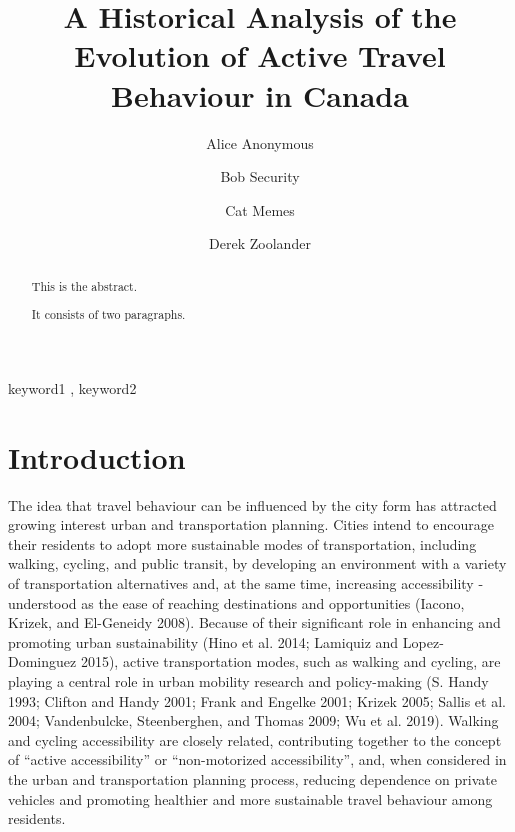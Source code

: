 \documentclass[preprint, 3p,
authoryear]{elsarticle} %
\begin{document}
\begin{frontmatter}

  \title{A Historical Analysis of the Evolution of Active Travel
Behaviour in Canada}
    \author[Some Institute of Technology]{Alice Anonymous%
  }
    \author[Another University]{Bob Security%
  }
    \author[Another University]{Cat Memes%
  }
    \author[Some Institute of Technology]{Derek Zoolander%
  }
  
  \begin{abstract}
  This is the abstract.

  It consists of two paragraphs.
  \end{abstract}
    \begin{keyword}
    keyword1 \sep 
    keyword2
  \end{keyword}
  
 \end{frontmatter}

\hypertarget{introduction}{%
\section{Introduction}\label{introduction}}

The idea that travel behaviour can be influenced by the city form has
attracted growing interest urban and transportation planning. Cities
intend to encourage their residents to adopt more sustainable modes of
transportation, including walking, cycling, and public transit, by
developing an environment with a variety of transportation alternatives
and, at the same time, increasing accessibility - understood as the ease
of reaching destinations and opportunities (Iacono, Krizek, and
El-Geneidy 2008). Because of their significant role in enhancing and
promoting urban sustainability (Hino et al. 2014; Lamiquiz and
Lopez-Dominguez 2015), active transportation modes, such as walking and
cycling, are playing a central role in urban mobility research and
policy-making (S. Handy 1993; Clifton and Handy 2001; Frank and Engelke
2001; Krizek 2005; Sallis et al. 2004; Vandenbulcke, Steenberghen, and
Thomas 2009; Wu et al. 2019). Walking and cycling accessibility are
closely related, contributing together to the concept of ``active
accessibility'' or ``non-motorized accessibility'', and, when considered
in the urban and transportation planning process, reducing dependence on
private vehicles and promoting healthier and more sustainable travel
behaviour among residents.
\end{document}
